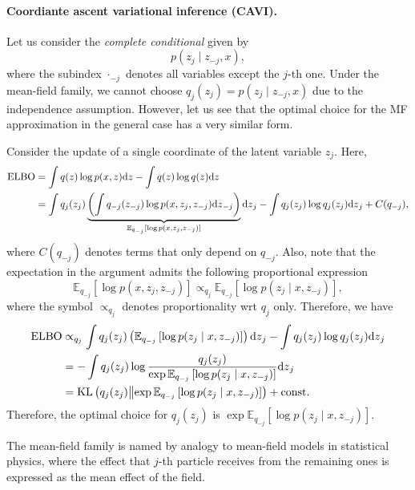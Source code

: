 \paragraph{Coordiante ascent variational inference (CAVI).} 

Let us consider the \emph{complete conditional} given by 
\[
p(z_j \mid z_{-j},x),\]
where the subindex $\cdot_{-j}$ denotes all variables except the $j$-th one. Under the mean-field family, we cannot choose $q_j(z_j) = p(z_j \mid z_{-j},x)$ due to the independence assumption. However, let us see that the optimal choice for the MF approximation in the general case has a very similar form. 

Consider the update of a single coordinate of the latent variable $z_j$. Here, 
\begin{align}
    {\text{ELBO}} 
    &= \int q(z)\log p(x,z){\text{d}z} - \int q(z) \log q(z){\text{d}z}\nonumber\\
    &= \int q_j(z_j)
        \underbrace{\left(\int q_{-j}(z_{-j}) \log p(x,z_j, z_{-j}){\text{d}z}_{-j}\right)}_{\mathbb{E}_{q_{-j}}\left[\log p(x,z_j, z_{-j})\right] }
       {\text{d}z}_j - \int q_j(z_j)\log q_j(z_j){\text{d}z}_j + C(q_{-j}),\nonumber
\end{align}
where $ C(q_{-j})$ denotes terms that only depend on $q_{-j}$. Also, note that  the expectation in the argument admits the following proportional expression
\begin{equation}
    \mathbb{E}_{q_{-j}}\left[\log p(x,z_j, z_{-j})\right]  \propto_{q_j} \mathbb{E}_{q_{-j}}\left[\log p(z_j\mid x, z_{-j})\right], \label{eq:prop_expectations_CAVI}    
\end{equation}
where the symbol $\propto_{q_j} $ denotes proportionality wrt $q_j$ only. Therefore, we have
\begin{align}
    {\text{ELBO}} 
     &\propto_{q_j} 
    \int q_j(z_j) \left(\mathbb{E}_{q_{-j}}\left[\log p(z_j\mid x, z_{-j})\right]\right)  {\text{d}z}_j -  \int q_j(z_j)\log q_j(z_j){\text{d}z}_j \nonumber\\
    &=
    - \int q_j(z_j)
    \log \frac
    {q_j(z_j)}
    {\exp \mathbb{E}_{q_{-j}}\left[\log p(z_j\mid x, z_{-j})\right]}
    {\text{d}z}_j \nonumber\\
    &=\text{KL}\left(q_j(z_j)\middle\|\exp \mathbb{E}_{q_{-j}}\left[\log p(z_j\mid x, z_{-j})\right]\right) + \text{const}.\label{eq:CAVI}
\end{align}
Therefore, the optimal choice for $q_j(z_j)$ is $\exp \mathbb{E}_{q_{-j}}\left[\log p(z_j\mid x, z_{-j})\right]$. 

\begin{remark}
    The mean-field family is named by analogy to mean-field models in statistical physics, where the effect that $j$-th particle receives from the remaining ones is expressed as the mean effect of the field. 
\end{remark}

